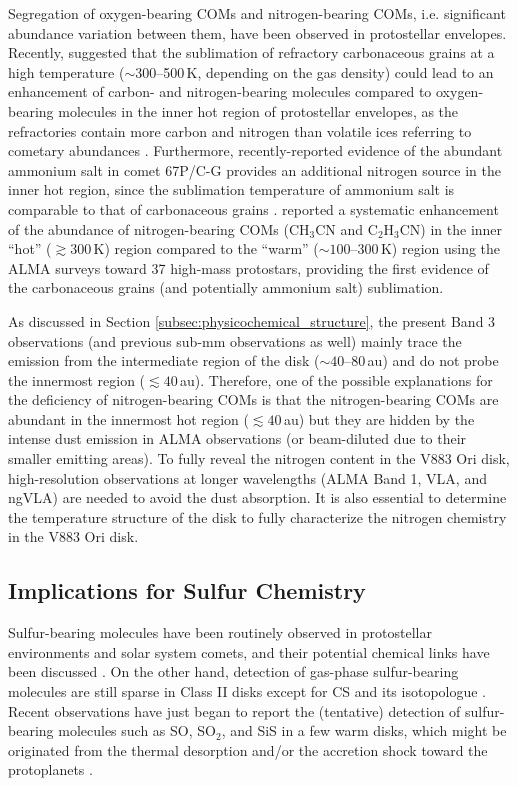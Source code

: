 \documentclass[twocolumn, twocolappendix, astrosymb, times]{aastex631}
\begin{document}
Segregation of oxygen-bearing COMs and nitrogen-bearing COMs, i.e. significant abundance variation between them, have been observed in protostellar envelopes.
Recently, \citet{vantHoff2020} suggested that the sublimation of refractory carbonaceous grains at a high temperature ($\sim300$--500\,K, depending on the gas density) could lead to an enhancement of carbon- and nitrogen-bearing molecules compared to oxygen-bearing molecules in the inner hot region of protostellar envelopes, as the refractories contain more carbon and nitrogen than volatile ices referring to cometary abundances \citep{Rice2018, Rubin2019}. Furthermore, recently-reported evidence of the abundant ammonium salt in comet 67P/C-G \citep{Altwegg2020, Poch2020} provides an additional nitrogen source in the inner hot region, since the sublimation temperature of ammonium salt is comparable to that of carbonaceous grains \citep[$\sim200$--250\,K; e.g.,][]{Noble2013, Bergner2016}. \citet{Nazari2023} reported a systematic enhancement of the abundance of nitrogen-bearing COMs (CH$_3$CN and C$_2$H$_3$CN) in the inner ``hot'' ($\gtrsim300$\,K) region compared to the ``warm'' ($\sim100$--300\,K) region using the ALMA surveys toward 37 high-mass protostars, providing the first evidence of the carbonaceous grains (and potentially ammonium salt) sublimation.

As discussed in Section \ref{subsec:physicochemical_structure}, the present Band 3 observations (and previous sub-mm observations as well) mainly trace the emission from the intermediate region of the disk ($\sim40$--80\,au) and do not probe the innermost region ($\lesssim40$\,au). Therefore, one of the possible explanations for the deficiency of nitrogen-bearing COMs is that the nitrogen-bearing COMs are abundant in the innermost hot region ($\lesssim40$\,au) but they are hidden by the intense dust emission in ALMA observations (or beam-diluted due to their smaller emitting areas). To fully reveal the nitrogen content in the V883 Ori disk, high-resolution observations at longer wavelengths (ALMA Band 1, VLA, and ngVLA) are needed to avoid the dust absorption. It is also essential to determine the temperature structure of the disk to fully characterize the nitrogen chemistry in the V883 Ori disk.

\subsection{Implications for Sulfur Chemistry}
Sulfur-bearing molecules have been routinely observed in protostellar environments and solar system comets, and their potential chemical links have been discussed \citep[e.g.,][]{Drozdovskaya2018}. On the other hand, detection of gas-phase sulfur-bearing molecules are still sparse in Class II disks except for CS and its isotopologue \citep[][and references therein]{LeGal2021}. Recent observations have just began to report the (tentative) detection of sulfur-bearing molecules such as SO, SO$_2$, and SiS in a few warm disks, which might be originated from the thermal desorption and/or the accretion shock toward the protoplanets \citep{Booth2021, Booth2023, Law2023_SiS}. 
\end{document}
